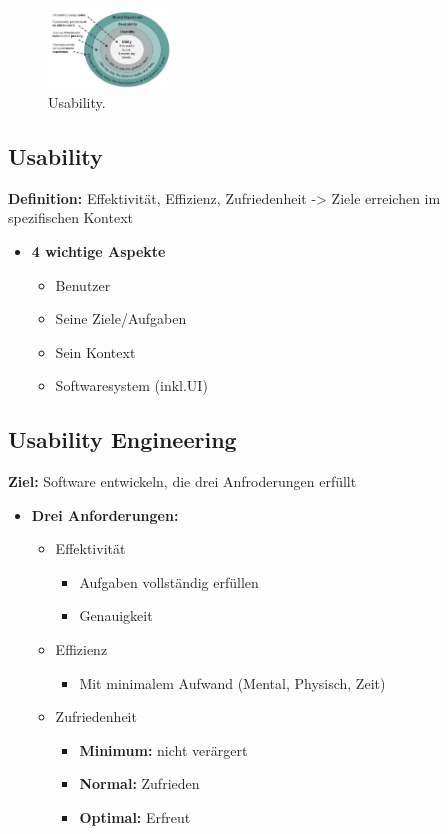 \documentclass[../ZF_SWEN1.tex]{subfiles}
\begin{document}
\begin{figure}[H]
\centering
\includegraphics[width=0.3\textwidth]{Resources/Images/Usability.png}
\caption{\label{fig:Usability}Usability.}
\end{figure}


\subsection{Usability}
\textbf{Definition: } Effektivität, Effizienz, Zufriedenheit -> Ziele erreichen im spezifischen Kontext \\

\begin{itemize}
	\item \textbf{4 wichtige Aspekte}
	\begin{itemize}
		\item Benutzer
		\item Seine Ziele/Aufgaben
		\item Sein Kontext
		\item Softwaresystem (inkl.UI)
	\end{itemize}
\end{itemize}


\subsection{Usability Engineering}

\textbf{Ziel: } Software entwickeln, die drei Anfroderungen erfüllt

\begin{itemize}
	\item \textbf{Drei Anforderungen: }
	\begin{itemize}
		\item Effektivität
		\begin{itemize}
			\item Aufgaben vollständig erfüllen
			\item Genauigkeit
		\end{itemize}
	
		\item Effizienz
		\begin{itemize}
			\item Mit minimalem Aufwand (Mental, Physisch, Zeit)
		\end{itemize}
					\item Zufriedenheit 
		\begin{itemize}
			\item \textbf{Minimum: } nicht verärgert
			\item \textbf{Normal: } Zufrieden
			\item \textbf{Optimal: } Erfreut
		\end{itemize}

	\end{itemize}

\end{itemize}
\end{document}
